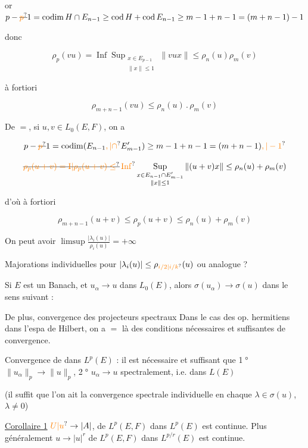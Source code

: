 or $p-\deleted{\unsure{p}}1=\operatorname{codim}H\cap E_{n-1}\geq\operatorname{cod}H+\operatorname{cod}E_{n-1}\geq m-1+n-1=(m+n-1)-1$

donc

\[
\rho_p(vu)=\mathop{\mathrm{Inf}}\mathop{\mathrm{Sup}}_{\substack{x\in E_{p-1}\\\|x\|\leq1}}\|vux\|\leq\rho_n(u)\rho_m(v)
\]

à fortiori

\[
\boxed{\rho_{m+n-1}(vu)\leq\rho_n(u)\mathbin{.}\rho_m(v)}
\]

De $=$, si $u,v\in L_0(E,F)$, on a

\[
p-\deleted{\unsure{p}}1=\operatorname{codim}(E_{n-1}\unsure{,|\cap} E'_{m-1})\geq m-1+n-1=(m+n-1)\unsure{,|-1}
\]

\[
\deleted{\unsure{\rho_p(u+v)=\mathrm I|\rho_p(u+v)\leq}}
\mathop{\unsure{\mathrm{Inf}}}\mathop{\mathrm{Sup}}_{\substack{x\in E_{n-1}\cap E'_{m-1}\\\|x\|\leq1}}
\|(u+v)x\|\leq\rho_n(u)+\rho_m(v)
\]

d'où à fortiori

\[
\rho_{m+n-1}(u+v)\leq\rho_p(u+v)\leq\rho_n(u)+\rho_m(v)
\]

 On peut avoir $\limsup\frac{|\lambda_i(u)|}{\rho_i(u)}=+\infty$

Majorations individuelles pour $|\lambda_i(u)|\leq\rho_{\unsure{i/2|i/k}}(u)$ ou analogue ?

Si $E$ est un Banach, et $u_\alpha\to u$ dans $L_0(E)$, alors $\sigma(u_\alpha)\to\sigma(u)$ dans le sens suivant :

De plus, convergence des projecteurs spectraux  Dans le cas des op. hermitiens dans l'espa de Hilbert, on a $=$ là des conditions nécessaires et suffisantes de convergence.

Convergence de   dans $L^p(E)$ : il est nécessaire et suffisant que \textcircled{\scriptsize 1°} $\|u_\alpha\|_p\to\|u\|_p$, \textcircled{\scriptsize 2°} $u_\alpha\to u$ spectralement, i.e. dans $L(E)$

(il suffit  que l'on ait la convergence spectrale individuelle en chaque $\lambda\in\sigma(u)$, $\lambda\neq0$)

\uline{Corollaire 1} $\unsure{U|u}\to|A|$, de $L^p(E,F)$ dans $L^p(E)$ est continue. Plus généralement $u\to|u|^r$ de $L^p(E,F)$ dans $L^{p/r}(E)$ est continue.

